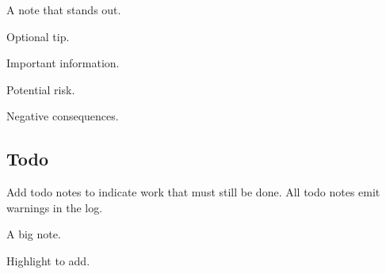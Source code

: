 \documentclass[10pt,titlepage]{article}
\begin{document}
\begin{example}
\begin{note}
  A note that stands out.
\end{note}
\end{example}

\begin{example}
\begin{tip}
  Optional tip.
\end{tip}
\end{example}

\begin{example}
\begin{important}
  Important information.
\end{important}
\end{example}

\begin{example}
\begin{caution}
  Potential risk.
\end{caution}
\end{example}

\begin{example}
\begin{danger}
  Negative consequences.
\end{danger}
\end{example}


\subsection{Todo}

\makeatletter
\let\old@stz@warning\@stz@warning
\let\@stz@warning\@gobble
\makeatother

Add todo notes to indicate work that must still be done.
All todo notes emit warnings in the log.

\begin{example}
\begin{todo}
  A big note.
\end{todo}
\end{example}

\begin{example}
Highlight  to add.
\todoadd{}
\end{example}
\end{document}
